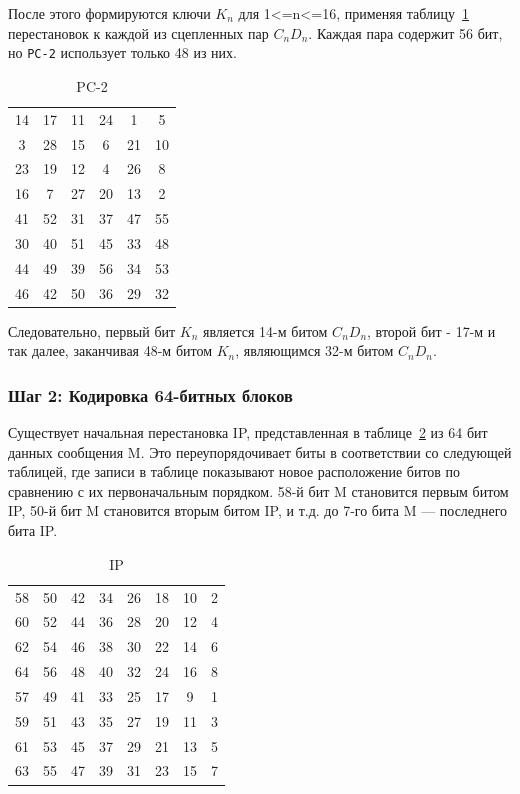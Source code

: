 После этого формируются ключи $K_n$ для 1<=n<=16, применяя таблицу~\ref{tbl:pc-2} перестановок к каждой из сцепленных пар $C_n D_n$.
Каждая пара содержит 56 бит, но \texttt{PC-2} использует только 48 из них.

\begin{table}[ht!]
    \begin{center}
		\captionsetup{justification=raggedright,singlelinecheck=off}
		\caption{\label{tbl:pc-2} PC-2}
        \begin{tabular}{ |c c c c c c| }
                14 & 17 & 11 & 24 & 1 & 5 \\
3 & 28 & 15 & 6 & 21 & 10 \\
23 & 19 & 12 & 4 & 26 & 8 \\
16 & 7 & 27 & 20 & 13 & 2 \\
41 & 52 & 31 & 37 & 47 & 55 \\
30 & 40 & 51 & 45 & 33 & 48 \\
44 & 49 & 39 & 56 & 34 & 53 \\
46 & 42 & 50 & 36 & 29 & 32
        \end{tabular}
    \end{center}
\end{table}

Следовательно, первый бит $K_n$ является 14-м битом $C_n D_n$, второй бит - 17-м и так далее, заканчивая 48-м битом $K_n$, являющимся 32-м битом $C_n D_n$.

\subsubsection{Шаг 2: Кодировка 64-битных блоков}

Существует начальная перестановка IP, представленная в таблице~\ref{tbl:ip} из 64 бит данных сообщения M. 
Это переупорядочивает биты в соответствии со следующей таблицей, где записи в таблице показывают новое расположение битов по сравнению с их первоначальным порядком. 
58-й бит M становится первым битом IP, 50-й бит M становится вторым битом IP, и т.д. до 7-го бита M --- последнего бита IP.

\begin{table}[ht!]
    \begin{center}
	\captionsetup{justification=raggedright,singlelinecheck=off}
	\caption{\label{tbl:ip} IP}
        \begin{tabular}{ |c c c c c c c c|}
                58 &    50  & 42  &  34  &  26  & 18  &  10 &   2 \\
60  &  52  & 44  &  36  &  28  & 20  &  12   & 4 \\
62  &  54  & 46  &  38  &  30  & 22  &  14   & 6 \\
64  &  56  & 48  &  40  &  32  & 24  &  16   & 8 \\
57  &  49  & 41  &  33  &  25  & 17  &   9   & 1 \\
59  &  51  & 43  &  35  &  27  & 19  &  11   & 3 \\
61  &  53  & 45  &  37  &  29  & 21  &  13   & 5 \\
63  &  55   & 47 &   39  &  31  & 23  &  15  &  7
        \end{tabular}
    \end{center}
\end{table}

